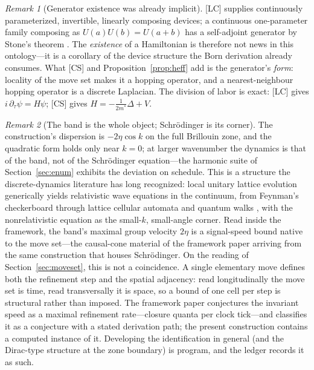 \documentclass[11pt]{article}
\theoremstyle{definition}
\theoremstyle{remark}
\newtheorem{remark}{Remark}
\begin{document}
\begin{remark}[Generator existence was already implicit]\label{rem:stone}
[LC] supplies continuously parameterized, invertible, linearly composing devices; a continuous one-parameter family composing as $U(a)U(b) = U(a+b)$ has a self-adjoint generator by Stone's theorem \cite{Stone1932}. The \emph{existence} of a Hamiltonian is therefore not news in this ontology---it is a corollary of the device structure the Born derivation already consumes. What [CS] and Proposition~\ref{prop:heff} add is the generator's \emph{form}: locality of the move set makes it a hopping operator, and a nearest-neighbour hopping operator is a discrete Laplacian. The division of labor is exact: [LC] gives $i\,\partial_\tau \psi = H\psi$; [CS] gives $H = -\tfrac{1}{2m^\ast}\Delta + V$.
\end{remark}

\begin{remark}[The band is the whole object; Schr\"odinger is its corner]\label{rem:band}
The construction's dispersion is $-2\eta\cos k$ on the full Brillouin zone, and the quadratic form holds only near $k = 0$; at larger wavenumber the dynamics is that of the band, not of the Schr\"odinger equation---the harmonic suite of Section~\ref{sec:enum} exhibits the deviation on schedule. This is a structure the discrete-dynamics literature has long recognized: local unitary lattice evolution generically yields relativistic wave equations in the continuum, from Feynman's checkerboard \cite{FeynmanHibbs1965} through lattice cellular automata \cite{BB1994,Meyer1996} and quantum walks \cite{Kempe2003}, with the nonrelativistic equation as the small-$k$, small-angle corner. Read inside the framework, the band's maximal group velocity $2\eta$ is a signal-speed bound native to the move set---the causal-cone material of the framework paper arriving from the same construction that houses Schr\"odinger. On the reading of Section~\ref{sec:moveset}, this is not a coincidence. A single elementary move defines both the refinement step and the spatial adjacency: read longitudinally the move set is time, read transversally it is space, so a bound of one cell per step is structural rather than imposed. The framework paper conjectures the invariant speed as a maximal refinement rate---closure quanta per clock tick---and classifies it as a conjecture with a stated derivation path; the present construction contains a computed instance of it. Developing the identification in general (and the Dirac-type structure at the zone boundary) is program, and the ledger records it as such.
\end{remark}
\end{document}
